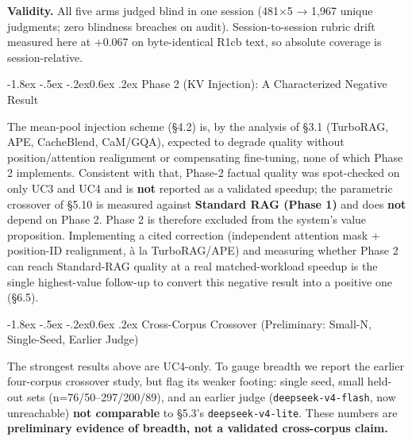 \documentclass[10pt,twocolumn]{article}
\makeatletter
\renewcommand\subsection{\@startsection{subsection}{2}{\z@}%
  {-1.8ex \@plus -.5ex \@minus -.2ex}{0.6ex \@plus .2ex}%
  {\normalfont\normalsize\bfseries}}
\makeatother
\begin{document}
\textbf{Validity.} All five arms judged blind in one session (481×5 → 1,967 unique judgments; zero blindness breaches on audit). Session-to-session rubric drift measured here at +0.067 on byte-identical R1cb text, so absolute coverage is session-relative.

\hypertarget{phase-2-kv-injection-a-characterized-negative-result}{%
\subsection{Phase 2 (KV Injection): A Characterized Negative Result}\label{phase-2-kv-injection-a-characterized-negative-result}}

The mean-pool injection scheme (§4.2) is, by the analysis of §3.1 (TurboRAG, APE, CacheBlend, CaM/GQA), expected to degrade quality without position/attention realignment or compensating fine-tuning, none of which Phase 2 implements. Consistent with that, Phase-2 factual quality was spot-checked on only UC3 and UC4 and is \textbf{not} reported as a validated speedup; the parametric crossover of §5.10 is measured against \textbf{Standard RAG (Phase 1)} and does \textbf{not} depend on Phase 2. Phase 2 is therefore excluded from the system's value proposition. Implementing a cited correction (independent attention mask + position-ID realignment, à la TurboRAG/APE) and measuring whether Phase 2 can reach Standard-RAG quality at a real matched-workload speedup is the single highest-value follow-up to convert this negative result into a positive one (§6.5).

\hypertarget{cross-corpus-crossover-preliminary-small-n-single-seed-earlier-judge}{%
\subsection{Cross-Corpus Crossover (Preliminary: Small-N, Single-Seed, Earlier Judge)}\label{cross-corpus-crossover-preliminary-small-n-single-seed-earlier-judge}}

The strongest results above are UC4-only. To gauge breadth we report the earlier four-corpus crossover study, but flag its weaker footing: single seed, small held-out sets (n=76/50--297/200/89), and an earlier judge (\texttt{deepseek-v4-flash}, now unreachable) \textbf{not comparable} to §5.3's \texttt{deepseek-v4-lite}. These numbers are \textbf{preliminary evidence of breadth, not a validated cross-corpus claim.}
\end{document}
